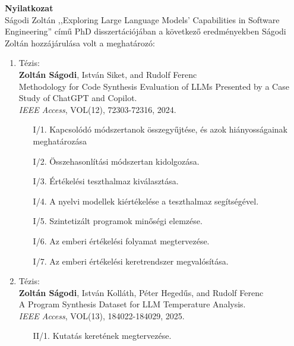 \documentclass{letter}
\begin{document}
\large{\textbf{Nyilatkozat}}
\\

Ságodi Zoltán ,,Exploring Large Language Models’ Capabilities in Software Engineering'' című PhD disszertációjában a következő ered\-mé\-nyek\-ben Ságodi Zoltán hozzájárulása volt a meghatározó:

\begin{enumerate}
	\item Tézis:\\
		\textbf{Zoltán Ságodi}, István Siket, and Rudolf Ferenc
		\\ {Methodology for Code Synthesis Evaluation of LLMs Presented by a Case Study of ChatGPT and Copilot}.
		\\ \emph{IEEE Access}, VOL(12), 72303-72316, 2024.

		\begin{itemize}
			\item[I/1.] Kapcsolódó módszertanok összegyűjtése, és azok hi\-á\-nyos\-sá\-ga\-i\-nak meghatározása
		
			\item[I/2.] Összehasonlítási módszertan kidolgozása.
			
			\item[I/3.] Értékelési teszthalmaz kiválasztása.
			
			\item[I/4.] A nyelvi modellek kiértékelése a teszthalmaz segítségével.
			
			\item[I/5.] Szintetizált programok minőségi elemzése.
			
			\item[I/6.] Az emberi értékelési folyamat megtervezése.
			
			\item[I/7.] Az emberi értékelési keretrendszer megvalósítása.
		\end{itemize}
\vspace{1em}
	\item Tézis:\\
	\textbf{Zoltán Ságodi}, István Kolláth, Péter Heged\H{u}s, and Rudolf Ferenc\\
	{A Program Synthesis Dataset for LLM Temperature Analysis}.\\
	\emph{IEEE Access}, VOL(13), 184022-184029, 2025.
	
		\begin{itemize}
			\item[II/1.] Kutatás keretének megtervezése.
			

\end{itemize}
\end{enumerate}
\end{document}
